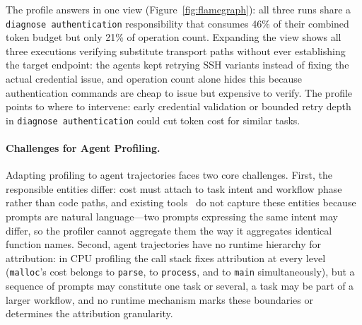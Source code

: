 \documentclass[sigconf,nonacm]{acmart}
\begin{document}
The profile answers in one view (Figure~\ref{fig:flamegraph}): all three runs share a \texttt{diagnose authentication} responsibility that consumes 46\% of their combined token budget but only 21\% of operation count.
Expanding the view shows all three executions verifying substitute transport paths without ever establishing the target endpoint: the agents kept retrying SSH variants instead of fixing the actual credential issue, and operation count alone hides this because authentication commands are cheap to issue but expensive to verify.
The profile points to where to intervene: early credential validation or bounded retry depth in \texttt{diagnose authentication} could cut token cost for similar tasks.

\paragraph{Challenges for Agent Profiling.}
Adapting profiling to agent trajectories faces two core challenges.
First, the responsible entities differ: cost must attach to task intent and workflow phase rather than code paths, and existing tools~\cite{otel,openinference} do not capture these entities because prompts are natural language---two prompts expressing the same intent may differ, so the profiler cannot aggregate them the way it aggregates identical function names.
Second, agent trajectories have no runtime hierarchy for attribution: in CPU profiling the call stack fixes attribution at every level (\texttt{malloc}'s cost belongs to \texttt{parse}, to \texttt{process}, and to \texttt{main} simultaneously), but a sequence of prompts may constitute one task or several, a task may be part of a larger workflow, and no runtime mechanism marks these boundaries or determines the attribution granularity.
\end{document}
